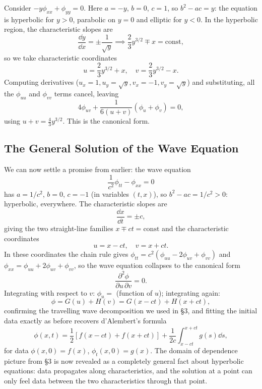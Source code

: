 \documentclass[a4paper]{scrartcl}
\begin{document}
\begin{example}
    Consider $-y \phi_{xx} + \phi_{yy} = 0$. Here $a = -y$, $b = 0$, $c = 1$, so $b^2 - ac = y$: the equation is hyperbolic for $y > 0$, parabolic on $y = 0$ and elliptic for $y < 0$.
    In the hyperbolic region, the characteristic slopes are
    $$
    \frac{\dd y}{\dd x} = \pm \frac{1}{\sqrt{y}} \implies \frac{2}{3} y^{3/2} \mp x = \text{const},
    $$
    so we take characteristic coordinates
    $$
    u = \frac{2}{3}y^{3/2} + x, \quad v = \frac{2}{3} y^{3/2} - x.
    $$
    Computing derivatives ($u_x = 1, u_y = \sqrt{y}, v_x = -1, v_y = \sqrt{y}$) and substituting, all the $\phi_{uu}$ and $\phi_{vv}$ terms cancel, leaving
    $$
    4 \phi_{uv} + \frac{1}{6 (u + v)}\left(\phi_u + \phi_v\right) = 0,
    $$
    using $u + v = \frac{4}{3}y^{3/2}$. This is the canonical form.
\end{example}

\subsection{The General Solution of the Wave Equation}

We can now settle a promise from earlier: the wave equation
$$
\frac{1}{c^2}\phi_{tt} - \phi_{xx} = 0
$$
has $a = 1/c^2$, $b = 0$, $c = -1$ (in variables $(t, x)$), so $b^2 - ac = 1/c^2 > 0$: hyperbolic, everywhere. The characteristic slopes are
$$
\frac{\dd x}{\dd t} = \pm c,
$$
giving the two straight-line families $x \mp ct = \text{const}$ and the characteristic coordinates
$$
u = x - ct, \quad v = x + ct.
$$
In these coordinates the chain rule gives $\phi_{tt} = c^2(\phi_{uu} - 2 \phi_{uv} + \phi_{vv})$ and $\phi_{xx} = \phi_{uu} + 2\phi_{uv} + \phi_{vv}$, so the wave equation collapses to the canonical form
$$
\frac{\partial^2 \phi}{\partial u \, \partial v} = 0.
$$
Integrating with respect to $v$: $\phi_u = $ (function of $u$); integrating again:
$$
\phi = G(u) + H(v) = G(x - ct) + H(x + ct),
$$
confirming the travelling wave decomposition we used in \S 3, and fitting the initial data exactly as before recovers d'Alembert's formula
$$
\phi(x, t) = \frac{1}{2}\left[f(x - ct) + f(x + ct)\right] + \frac{1}{2c}\int_{x - ct}^{x + ct} g(s) \dd s,
$$
for data $\phi(x, 0) = f(x)$, $\phi_t(x, 0) = g(x)$. The domain of dependence picture from \S 3 is now revealed as a completely general fact about hyperbolic equations: data propagates along characteristics, and the solution at a point can only feel data between the two characteristics through that point.
\end{document}
